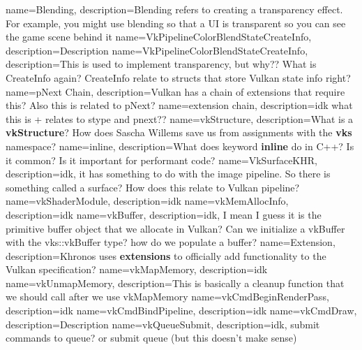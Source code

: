 \documentclass{article}
\begin{document}
{
name={Blending},
description={Blending refers to creating a transparency
  effect. For example, you might use blending so that a UI is
transparent so you can see the game scene behind it}
}
{
name={VkPipelineColorBlendStateCreateInfo},
description={Description}
}
{
name={VkPipelineColorBlendStateCreateInfo},
description={This is used to implement transparency, but why?? What
  is CreateInfo again? CreateInfo relate to structs that store Vulkan
state info right?}
}
{
name={pNext Chain},
description={Vulkan has a chain of extensions that require this?
Also this is related to pNext?}
}
{
name={extension chain},
description={idk what this is + relates to stype and pnext??}
}
{
name={vkStructure},
description={What is a \textbf{vkStructure}? How does Sascha
Willems save us from assignments with the \textbf{vks} namespace?}
}
{
name={inline},
description={What does keyword \textbf{inline} do in C++? Is it
common? Is it important for performant code?}
}
{
name={VkSurfaceKHR},
description={idk, it has something to do with the image pipeline. So
there is something called a surface? How does this relate to Vulkan pipeline?}
}
{
name={vkShaderModule},
description={idk}
}
{
name={vkMemAllocInfo},
description={idk}
}
{
name={vkBuffer},
description={idk, I mean I guess it is the primitive buffer object
  that we allocate in Vulkan? Can we initialize a vkBuffer with the
vks::vkBuffer type? how do we populate a buffer?}
}
{
name={Extension},
description={Khronos uses \textbf{extensions} to officially add
functionality to the Vulkan specification?}
}
{
name={vkMapMemory},
description={idk}
}
{
name={vkUnmapMemory},
description={This is basically a cleanup function that we should call
after we use vkMapMemory}
}
{
name={vkCmdBeginRenderPass},
description={idk}
}
{
name={vkCmdBindPipeline},
description={idk}
}
{
name={vkCmdDraw},
description={Description}
}
{
name={vkQueueSubmit},
description={idk, submit commands to queue? or submit queue (but
this doesn't make sense)}
}
\end{document}
